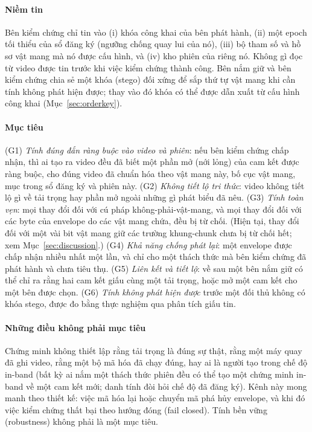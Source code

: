 \documentclass[journal]{IEEEtran}
\begin{document}
\paragraph{Niềm tin}
Bên kiểm chứng chỉ tin vào (i) khóa công khai của bên phát hành, (ii) một epoch
tối thiểu của sổ đăng ký (ngưỡng chống quay lui của nó), (iii) bộ tham số và hồ
sơ vật mang mà nó được cấu hình, và (iv) kho phiên của riêng nó. Không gì đọc từ
video được tin trước khi việc kiểm chứng thành công. Bên nắm giữ và bên kiểm
chứng chia sẻ một khóa (stego) đối xứng để sắp thứ tự vật mang khi cần tính
không phát hiện được; thay vào đó khóa có thể được dẫn xuất từ cấu hình công khai
(Mục~\ref{sec:orderkey}).

\paragraph{Mục tiêu}
(G1) \emph{Tính đúng đắn ràng buộc vào video và phiên}: nếu bên kiểm chứng chấp
nhận, thì ai tạo ra video đều đã biết một phần mở (nới lỏng) của cam kết được
ràng buộc, cho đúng video đã chuẩn hóa theo vật mang này, bố cục vật mang, mục
trong sổ đăng ký và phiên này.
(G2) \emph{Không tiết lộ tri thức}: video không tiết lộ gì về tải trọng hay phần
mở ngoài những gì phát biểu đã nêu.
(G3) \emph{Tính toàn vẹn}: mọi thay đổi đối với cú pháp không-phải-vật-mang, và
mọi thay đổi đối với các byte của envelope do các vật mang chứa, đều bị từ chối.
(Hiện tại, thay đổi đối với một vài bit vật mang giữ các trường khung-chunk chưa
bị từ chối hết; xem Mục~\ref{sec:discussion}.)
(G4) \emph{Khả năng chống phát lại}: một envelope được chấp nhận nhiều nhất một
lần, và chỉ cho một thách thức mà bên kiểm chứng đã phát hành và chưa tiêu thụ.
(G5) \emph{Liên kết và tiết lộ}: về sau một bên nắm giữ có thể chỉ ra rằng hai
cam kết giấu cùng một tải trọng, hoặc mở một cam kết cho một bên được chọn.
(G6) \emph{Tính không phát hiện được} trước một đối thủ không có khóa stego, được
đo bằng thực nghiệm qua phân tích giấu tin.

\paragraph{Những điều không phải mục tiêu}
Chứng minh không thiết lập rằng tải trọng là đúng sự thật, rằng một máy quay đã
ghi video, rằng một bộ mã hóa đã chạy đúng, hay ai là người tạo trong chế độ
in-band (bất kỳ ai nắm một thách thức phiên đều có thể tạo một chứng minh in-band
về một cam kết mới; danh tính đòi hỏi chế độ đã đăng ký). Kênh này mong manh theo
thiết kế: việc mã hóa lại hoặc chuyển mã phá hủy envelope, và khi đó việc kiểm
chứng thất bại theo hướng đóng (fail closed). Tính bền vững (robustness) không
phải là một mục tiêu.
\end{document}
